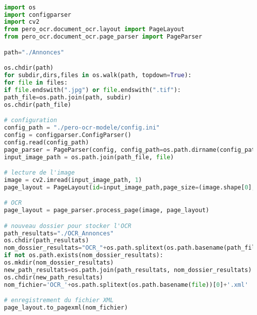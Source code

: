 \begin{lstlisting}[language=Python,caption=Code Pero-OCR]

import os
import configparser
import cv2
from pero_ocr.document_ocr.layout import PageLayout
from pero_ocr.document_ocr.page_parser import PageParser

path="./Annonces"

os.chdir(path)
for subdir,dirs,files in os.walk(path, topdown=True):
for file in files:
if file.endswith(".jpg") or file.endswith(".tif"):
path_file=os.path.join(path, subdir)
os.chdir(path_file)

# configuration
config_path = "./pero-ocr-modele/config.ini"
config = configparser.ConfigParser()
config.read(config_path)
page_parser = PageParser(config, config_path=os.path.dirname(config_path))
input_image_path = os.path.join(path_file, file)

# lecture de l'image
image = cv2.imread(input_image_path, 1)
page_layout = PageLayout(id=input_image_path,page_size=(image.shape[0], image.shape[1]))

# OCR
page_layout = page_parser.process_page(image, page_layout)

# nouveau dossier pour stocker l'OCR
path_resultats="./OCR_Annonces"
os.chdir(path_resultats)
nom_dossier_resultats="OCR_"+os.path.splitext(os.path.basename(path_file))[0]
if not os.path.exists(nom_dossier_resultats):
os.mkdir(nom_dossier_resultats)
new_path_resultats=os.path.join(path_resultats, nom_dossier_resultats)
os.chdir(new_path_resultats)
nom_fichier='OCR_'+os.path.splitext(os.path.basename(file))[0]+'.xml'

# enregistrement du fichier XML
page_layout.to_pagexml(nom_fichier)
			
\end{lstlisting}

\bigskip
		

